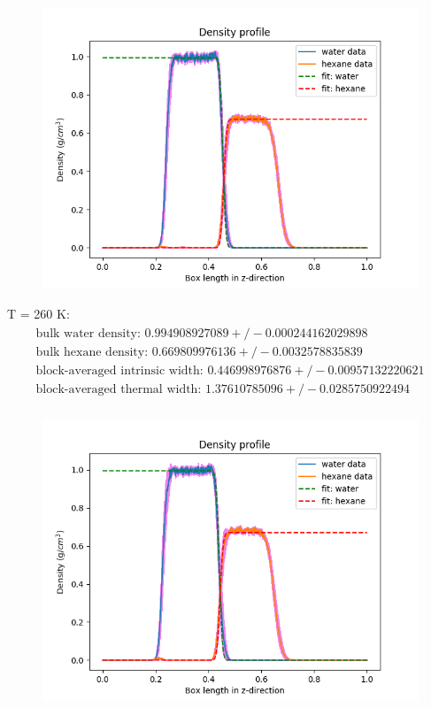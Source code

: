 \documentclass[12pt,reqno]{amsart}
\numberwithin{equation}{section}
\begin{document}
\begin{enumerate}
\begin{figure}[H]
\centering
\includegraphics[scale=0.6]{interface_density_profile_full-265-32bead-combined}
\end{figure}



T = 260 K:
\begin{align}
\begin{split}
\text{bulk water density: } 0.994908927089  +/- 0.000244162029898 \\
\text{bulk hexane density: } 0.669809976136  +/- 0.0032578835839\\
\text{block-averaged intrinsic width: }  0.446998976876 +/- 0.00957132220621\\
\text{block-averaged thermal width: }  1.37610785096  +/- 0.0285750922494 \\
\end{split}
\end{align} 

\begin{figure}[H]
\centering
\includegraphics[scale=0.6]{interface_density_profile_full-260-32bead-combined}
\end{figure}



\end{enumerate}
\end{document}
